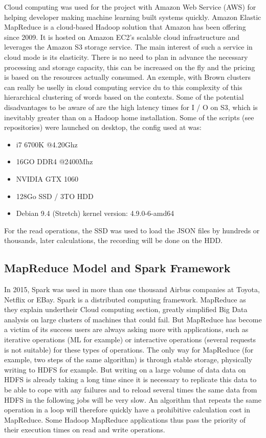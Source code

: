 \documentclass{acmtog} %
\begin{document}
Cloud computing was used for the project with Amazon Web Service (AWS) for helping developer making machine learning built systems quickly. 
Amazon Elastic MapReduce is a cloud-based Hadoop solution that Amazon has been offering since 2009. It is hosted on Amazon EC2's scalable cloud infrastructure and leverages the Amazon S3 storage service. The main interest of such a service in cloud mode is its elasticity. There is no need to plan in advance the necessary processing and storage capacity, this can be increased on the fly and the pricing is based on the resources actually consumed. An exemple, with Brown clusters can really be uselly \citep{Marquez16} in cloud computing service du to this complexity of this hierarchical clustering of words based on the contexts.
Some of the potential disadvantages to be aware of are the high latency times for I / O on S3, which is inevitably greater than on a Hadoop home installation. Some of the scripts (see repositories) were launched on desktop, the config used at was:
\begin{itemize}
\item  i7 6700K @4.20Ghz
\item  16GO DDR4 @2400Mhz
\item  NVIDIA GTX 1060
\item  128Go SSD / 3TO HDD
\item  Debian 9.4 (Stretch) kernel version: 4.9.0-6-amd64
\end{itemize}

For the read operations, the SSD was used to load the JSON files by hundreds or thousands, later calculations, the recording will be done on the HDD.

\subsection{MapReduce Model and Spark Framework}
\label{subsub:mapreduce_spark}

In 2015, Spark was used in more than one thousand Airbus companies at Toyota, Netflix or EBay. Spark is a distributed computing framework. MapReduce \cite{Baltas17} as they explain undertheir Cloud computing section, greatly simplified Big Data analysis on large clusters of machines that could fail. But MapReduce has become a victim of its success users are always asking more with applications, such as iterative operations (ML for example) or interactive operations (several requests is not suitable) for these types of operations. The only way for MapReduce (for example, two steps of the same algorithm) is through stable storage, physically writing to HDFS for example. But writing on a large volume of data data on HDFS is already taking a long time since it is necessary to replicate this data to be able to cope with any failures and to reload several times the same data from HDFS in the following jobs will be very slow. An algorithm that repeats the same operation in a loop will therefore quickly have a prohibitive calculation cost in MapReduce. Some Hadoop MapReduce applications thus pass the priority of their execution times on read and write operations.
\end{document}

